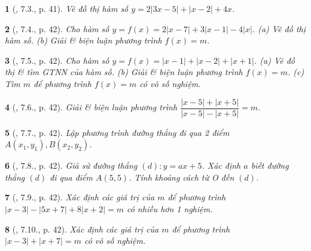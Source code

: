 \documentclass{article}
\newtheorem{baitoan}{}
\begin{document}
\begin{baitoan}[\cite{TLCT_THCS_Toan_9_dai_so}, 7.3., p. 41]
	Vẽ đồ thị hàm số $y = 2|3x - 5| + |x - 2| + 4x$.
\end{baitoan}

\begin{baitoan}[\cite{TLCT_THCS_Toan_9_dai_so}, 7.4., p. 42]
	Cho hàm số $y = f(x) = 2|x - 7| + 3|x - 1| - 4|x|$. (a) Vẽ đồ thị hàm số. (b) Giải \& biện luận phương trình $f(x) = m$. 
\end{baitoan}

\begin{baitoan}[\cite{TLCT_THCS_Toan_9_dai_so}, 7.5., p. 42]
	Cho hàm số $y = f(x) = |x - 1| + |x - 2| + |x + 1|$. (a) Vẽ đồ thị \& tìm {\rm GTNN} của hàm số. (b) Giải \& biện luận phương trình $f(x) = m$. (c) Tìm $m$ để phương trình $f(x) = m$ có vô số nghiệm.
\end{baitoan}

\begin{baitoan}[\cite{TLCT_THCS_Toan_9_dai_so}, 7.6., p. 42]
	Giải \& biện luận phương trình $\dfrac{|x - 5| + |x + 5|}{|x - 5| - |x + 5|} = m$.
\end{baitoan}

\begin{baitoan}[\cite{TLCT_THCS_Toan_9_dai_so}, 7.7., p. 42]
	Lập phương trình đường thẳng đi qua 2 điểm $A(x_1,y_1),B(x_2,y_2)$.
\end{baitoan}

\begin{baitoan}[\cite{TLCT_THCS_Toan_9_dai_so}, 7.8., p. 42]
	Giả sử đường thẳng $(d):y = ax + 5$. Xác định $a$ biết đường thẳng $(d)$ đi qua điểm $A(5,5)$. Tính khoảng cách từ O đến $(d)$.
\end{baitoan}

\begin{baitoan}[\cite{TLCT_THCS_Toan_9_dai_so}, 7.9., p. 42]
	Xác định các giá trị của $m$ để phương trình $|x - 3| - |5x + 7| + 8|x + 2| = m$ có nhiều hơn 1 nghiệm.
\end{baitoan}

\begin{baitoan}[\cite{TLCT_THCS_Toan_9_dai_so}, 7.10., p. 42]
	Xác định các giá trị của $m$ để phương trình $|x - 3| + |x + 7| = m$ có vô số nghiệm.
\end{baitoan}

\end{document}
